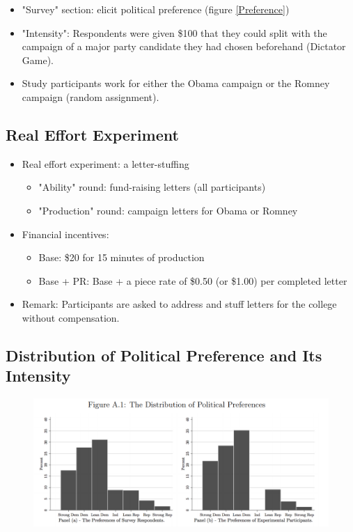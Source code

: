 \documentclass[../root]{subfiles}
\begin{document}
    \begin{itemize}
        \item "Survey" section: elicit political preference (figure \ref{Preference})
        \item "Intensity": Respondents were given \$100 that they could split with the campaign of a major party candidate they had chosen beforehand (Dictator Game).
        \item Study participants work for either the Obama campaign or the Romney campaign (random assignment).
    \end{itemize}

    \subsection{Real Effort Experiment}
    
    \begin{itemize}
        \item Real effort experiment: a letter-stuffing
        \begin{itemize}
            \item "Ability" round: fund-raising letters (all participants)
            \item "Production" round: campaign letters for Obama or Romney
        \end{itemize}
        \item Financial incentives:
        \begin{itemize}
            \item Base: \$20 for 15 minutes of production
            \item Base + PR: Base + a piece rate of \$0.50 (or \$1.00) per completed letter
        \end{itemize}
        \item Remark: Participants are asked to address and stuff letters for the college without compensation.
    \end{itemize}
    
    \subsection{Distribution of Political Preference and Its Intensity}

    \begin{figure}[h]
        \centering
        \includegraphics[width = 1.0\linewidth]{os0602kato/pref_result.PNG}
        \label{Result: Preference}
    \end{figure}
\end{document}
